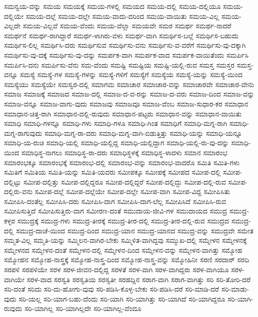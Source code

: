 {ಸಮನ್ವಯ-ವನ್ನು
ಸಮಯ
ಸಮಯಕ್ಕೆ
ಸಮಯ-ಗಳಲ್ಲಿ
ಸಮಯದ
ಸಮಯ-ದಲ್ಲಿ
ಸಮಯ-ದಲ್ಲಿಯೂ
ಸಮಯ-ದಲ್ಲಿಯೇ
ಸಮಯ-ದಲ್ಲೆ
ಸಮಯ-ದಲ್ಲೇ
ಸಮಯ-ವಾದು-ದರಿಂದ
ಸಮಯ-ವಾಯಿತು
ಸಮಯ-ವಿಲ್ಲ
ಸಮಯ-ವಿಲ್ಲದೇ
ಸಮಯ-ವಿಲ್ಲವೆ
ಸಮಯ-ವೆಂದು
ಸಮಯ-ವೆಲ್ಲಾ
ಸಮಯವೇ
ಸಮರ
ಸಮರ್ಥ
ಸಮರ್ಥ-ನಾದರೆ
ಸಮರ್ಥನೆ
ಸಮರ್ಥ-ರಾಗಿದ್ದಾರೆ
ಸಮರ್ಥ-ಳಾಗಿರು-ವಳು
ಸಮರ್ಥ-ವಾಗಿ
ಸಮರ್ಥಿಸ-ಬಲ್ಲೆ
ಸಮರ್ಥಿಸ-ಬಹುದು
ಸಮರ್ಥಿಸ-ಲಿಲ್ಲ
ಸಮರ್ಥಿಸಿ-ದರು
ಸಮರ್ಥಿಸುವ
ಸಮರ್ಥಿಸು-ವನು
ಸಮರ್ಥಿಸು-ವ-ವರೆಗೆ
ಸಮರ್ಥಿಸು-ವು-ದಕ್ಕಾಗಿ
ಸಮರ್ಥಿಸು-ವು-ದಕ್ಕೆ
ಸಮರ್ಥಿಸು-ವು-ದನ್ನು
ಸಮರ್ಪಕ-ವಾಗಿ
ಸಮರ್ಪಕ-ವಾದ
ಸಮರ್ಪಕ-ವಾಯಿತೆಂದು
ಸಮರ್ಪಿಸಿ
ಸಮರ್ಪಿಸಿ-ದನು
ಸಮರ್ಪಿಸು-ವೆನು
ಸಮ-ವೆಂದು
ಸಮಷ್ಟಿ
ಸಮಷ್ಟಿಯ
ಸಮಷ್ಟಿ-ಯಲ್ಲಿ-ರುವ
ಸಮಸ್ತ
ಸಮಸ್ತರ
ಸಮಸ್ತ-ವನ್ನೂ
ಸಮಸ್ಯೆ
ಸಮಸ್ಯೆ-ಗಳ
ಸಮಸ್ಯೆ-ಗಳನ್ನು
ಸಮಸ್ಯೆ-ಗಳಿಗೆ
ಸಮಸ್ಯೆಗೆ
ಸಮಸ್ಯೆಯ
ಸಮಸ್ಯೆ-ಯನ್ನು
ಸಮಸ್ಯೆ-ಯಿಂದ
ಸಮಸ್ಯೆಯು
ಸಮಸ್ಯೆಯೇ
ಸಮಸ್ವರ-ದಲ್ಲಿ
ಸಮಾಗಮ
ಸಮಾಚಾರ
ಸಮಾಚಾರ-ವನ್ನು
ಸಮಾಚಾರವೇ
ಸಮಾಚಾರ-ವೇನು
ಸಮಾಜ
ಸಮಾಜಕ್ಕೆ
ಸಮಾಜದ
ಸಮಾಜ-ದಲ್ಲಿ
ಸಮಾಜ-ದ-ವ-ರನ್ನು
ಸಮಾಜ-ದ-ವರು
ಸಮಾಜ-ದಿಂದ
ಸಮಾಜ-ವನ್ನು
ಸಮಾಜ-ವನ್ನೂ
ಸಮಾಜ-ವಾಗು-ವುದು
ಸಮಾಜವು
ಸಮಾಜವೂ
ಸಮಾಜ-ವೆಂಬ
ಸಮಾಜ-ಸುಧಾರ-ಕರ
ಸಮಾಧಾನ
ಸಮಾಧಾನ-ಚಿತ್ತ-ರಾಗಿ
ಸಮಾಧಾನ-ದಲ್ಲಿ-ರುವುದು
ಸಮಾಧಾನ-ಪಟ್ಟರು
ಸಮಾಧಾನ-ವನ್ನು
ಸಮಾಧಾನ-ವಾಯಿತು
ಸಮಾಧಿ
ಸಮಾಧಿ-ಗಳನ್ನೂ
ಸಮಾಧಿ-ಗಳು
ಸಮಾಧಿ-ಗಳೂ
ಸಮಾಧಿ-ಗಿಂತ
ಸಮಾಧಿಗೆ
ಸಮಾಧಿ-ಮಗ್ನ-ರಾಗಿ
ಸಮಾಧಿ-ಮಗ್ನ-ರಾಗುವುದು
ಸಮಾಧಿ-ಮಗ್ನ-ರಾ-ದರು
ಸಮಾಧಿ-ಮಗ್ನ-ವಾಗಿ-ಬಿಡುತ್ತಿತ್ತು
ಸಮಾಧಿ-ಯನ್ನು
ಸಮಾಧಿ-ಯನ್ನೂ
ಸಮಾಧಿ-ಯ-ರುಚಿ
ಸಮಾಧಿ-ಯಲ್ಲಿ
ಸಮಾಧಿ-ಯಲ್ಲಿದ್ದ
ಸಮಾಧಿ-ಯಲ್ಲಿದ್ದಾಗ
ಸಮಾಧಿ-ಯಲ್ಲಿ-ರು-ವು-ದನ್ನು
ಸಮಾಧಿ-ಯಿಂದ
ಸಮಾಧಿಸ್ಥ-ನಾಗಲು
ಸಮಾಧಿಸ್ಥ-ರಾ-ದರು
ಸಮಾಧಿಸ್ಥಳಕ್ಕೆ
ಸಮಾಧಿಸ್ಥ-ಳಾದಳು
ಸಮಾನ
ಸಮಾರಂಭ
ಸಮಾರಂಭಕ್ಕೂ
ಸಮಾರಂಭಕ್ಕೆ
ಸಮಾರಂಭ-ದಲ್ಲಿ
ಸಮಾರಂಭ-ವನ್ನು
ಸಮಾರಂಭ-ವಾದರೊ
ಸಮಿತಿ
ಸಮಿತಿ-ಗಳು
ಸಮಿತಿಗೆ
ಸಮಿತಿಯ
ಸಮಿತಿ-ಯನ್ನು
ಸಮಿತಿ-ಯವರು
ಸಮೀಪಕ್ಕೂ
ಸಮೀಪಕ್ಕೆ
ಸಮೀಪದ
ಸಮೀಪ-ದಲ್ಲಿ
ಸಮೀಪ-ದಲ್ಲಿಟ್ಟು
ಸಮೀಪ-ದಲ್ಲಿತ್ತು
ಸಮೀಪ-ದಲ್ಲಿದ್ದರೂ
ಸಮೀಪ-ದಲ್ಲಿದ್ದರೆ
ಸಮೀಪ-ದಲ್ಲಿದ್ದು
ಸಮೀಪ-ದಲ್ಲಿ-ರುವ
ಸಮೀಪ-ದಲ್ಲಿರು-ವನು
ಸಮೀಪ-ದಲ್ಲೆ
ಸಮೀಪ-ದಲ್ಲೆಯೇ
ಸಮೀಪ-ದಲ್ಲೇ
ಸಮೀಪ-ವಾಗಿ
ಸಮೀಪ-ವಿದ್ದ
ಸಮೀಪಿಸಿತು
ಸಮೀಪಿಸಿ-ದಂತೆಲ್ಲ
ಸಮೀಪಿಸಿ-ದರು
ಸಮೀಪಿಸಿ-ದಾಗ
ಸಮೀಪಿಸಿ-ದಾಗ-ಲೆಲ್ಲ
ಸಮೀಪಿಸಿದೆ
ಸಮೀಪಿಸಿ-ರುವ
ಸಮೀಪಿಸುತ್ತಿದೆ
ಸಮೀಪಿಸುತ್ತಿರು-ವಾಗ
ಸಮೀರಣ-ದಂತೆ
ಸಮುದಾಯ-ಜೀವಿ-ಗಳ
ಸಮುದಾಯದ
ಸಮುದ್ರ
ಸಮುದ್ರ-ಕಳ್ಳರ
ಸಮುದ್ರಕ್ಕೆ
ಸಮುದ್ರ-ಗಳು
ಸಮುದ್ರ-ತೀರಕ್ಕೆ
ಸಮುದ್ರ-ತೀರ-ದಲ್ಲಿ
ಸಮುದ್ರ-ತೀರ-ದಲ್ಲಿ-ರುವ
ಸಮುದ್ರದ
ಸಮುದ್ರ-ದಲ್ಲಿ
ಸಮುದ್ರ-ದಾಚೆ-ಯಿಂದ
ಸಮುದ್ರ-ದಿಂದ
ಸಮುದ್ರ-ಯಾನ
ಸಮುದ್ರ-ಯಾನದ
ಸಮುದ್ರ-ವನ್ನು
ಸಮುದ್ರವೇ
ಸಮೇತ
ಸಮ್ಮತ-ವಿಲ್ಲ
ಸಮ್ಮತಿ-ಯನ್ನು
ಸಮ್ಮಿಲನ-ವಾಗಿರ-ಬೇಕು
ಸಮ್ಮಿಳಿತ-ವಾಗಿದ್ದವು
ಸಮ್ಮುಖ-ದಲ್ಲಿ
ಸಮ್ಮೇಳನ
ಸಮ್ಮೇಳನಕ್ಕೆ
ಸಮ್ಮೇಳನದ
ಸಮ್ಮೇಳನ-ದಂತೆ
ಸಮ್ಮೇಳನ-ದಲ್ಲಿ
ಸಮ್ಮೇಳನ-ದಿಂದ
ಸಮ್ಮೇಳನ-ವನ್ನು
ಸಮ್ಮೇಳನ-ವಾಗಿತ್ತು
ಸಮ್ಮೋಹ
ಸಮ್ಮೋಹನ
ಸಮ್ಮೋಹ-ನಾಸ್ತ್ರಕ್ಕೆ
ಸಮ್ಮೋಹ-ನಾಸ್ತ್ರ-ದಿಂದ
ಸಮ್ಮೋಹ-ನಾಸ್ತ್ರ-ವನ್ನು
ಸಮ್ಮೋಹಿನೀ
ಸರಣಿ
ಸರದಾರ್
ಸರದಿ
ಸರಪಳಿ
ಸರಪಳಿಯೇ
ಸರಳ
ಸರಳ-ಜೀವನ-ದಲ್ಲಿದ್ದ
ಸರಳತೆ
ಸರಳ-ವಾಗಿ
ಸರಳ-ವಾಗಿದ್ದರು
ಸರಳ-ವಾಗಿಯೂ
ಸರಳ-ವಾಗಿಯೇ
ಸರಳ-ವಾದ
ಸರಸ್ವತಿ
ಸರಸ್ವತಿಯ
ಸರಸ್ವತೀ
ಸರಹದ್ದಿನ
ಸರಾಗ-ವಾಗಿ
ಸರಾಗ-ವಾಗಿತ್ತು
ಸರಿ
ಸರಿ-ತೋರಿ-ದರೆ
ಸರಿ-ದಂತೆ
ಸರಿದು
ಸರಿ-ದು-ಹೋಗು-ವುವು
ಸರಿ-ಪಡಿಸಿ-ಕೊಳ್ಳ-ಬೇಕು
ಸರಿ-ಪಡಿಸಿ-ದರೆ
ಸರಿ-ಮಾಡಿ-ದರೆ
ಸರಿ-ಮಾಡು-ವುದು
ಸರಿ-ಯಲ್ಲ
ಸರಿ-ಯಾಗ-ಬಹು-ದೆಂದು
ಸರಿ-ಯಾಗಿ
ಸರಿ-ಯಾಗಿತ್ತು
ಸರಿ-ಯಾಗಿದೆ
ಸರಿ-ಯಾಗಿದ್ದರೂ
ಸರಿ-ಯಾಗಿ-ರುವುದು
ಸರಿ-ಯಾಗಿಲ್ಲ
ಸರಿ-ಯಾಗಿಲ್ಲದೇ
ಸರಿ-ಯಾಗಿಲ್ಲ-ವೆಂದೂ
}
